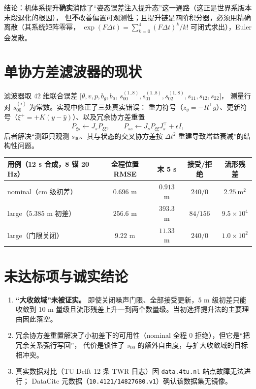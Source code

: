 \documentclass[11pt,a4paper]{ctexart}
\begin{document}
结论：机体系提升\textbf{确实}消除了“姿态误差注入提升态”这一通路（这正是世界系版本末段退化的根因），
但\textbf{不}改善偏置可观测性；且提升链是四阶积分器，必须用精确离散（其系统矩阵零幂，
\(\exp(F\Delta t)=\sum_{k=0}^{4}(F\Delta t)^k/k!\) 可闭式求出），Euler 会发散。

\section{单协方差滤波器的现状}

滤波器取 42 维联合误差
\(\big[\theta,v,p,b_g,b_a,\,s_{00}^{(1..8)},s_{01}^{(1..8)},s_{02}^{(1..8)},s_{11},s_{12},s_{22}\big]\)，
测量行对 \(s_{00}^{(i)}\) 为常数。实现中修正了三处真实错误：
重力符号（\(z_g=-R^{\top}g\)）、更新符号（\(\xi^{+}=+K(y-\hat y)\)）、以及冗余协方差重置
\begin{equation}
P_{\xi s}\leftarrow J_sP_{\xi\xi},\qquad
P_{ss}\leftarrow J_sP_{\xi\xi}J_s^{\top}+\epsilon I ,
\end{equation}
后者解决“测距只观测 \(s_{00}\)、其与状态的交叉协方差按 \(\Delta t^2\) 重建导致增益衰减”的结构性问题。

\begin{table}[h]
\centering
\small
\begin{tabular}{lcccc}
\toprule
用例（12 s 合成，8 锚 20 Hz） & 全程位置 RMSE & 末 5 s & 接受/拒绝 & 流形残差 \\
\midrule
nominal（cm 级初差） & \(0.696\) m & \(0.913\) m & \(240/0\) & \(2.25\ \mathrm{m^2}\) \\
large（\(5.385\) m 初差） & \(256.6\) m & \(393.3\) m & \(84/156\) & \(9.5\times10^{4}\) \\
large（门限关闭） & \(9.22\) m & \(11.33\) m & \(240/0\) & \(1.0\times10^{2}\) \\
\bottomrule
\end{tabular}
\end{table}

\section{未达标项与诚实结论}

\begin{enumerate}
\item \textbf{“大收敛域”未被证实。} 即使关闭噪声门限、全部接受更新，5 m 级初差只能收敛到
10 m 量级且流形残差上升一到两个数量级。当初选择提升法的主要理由因此落空。
\item 冗余协方差重置解决了小初差下的可用性（nominal 全程 0 拒绝），但它是“把冗余关系强行写回”，
代价是锁住了 \(s_{00}\) 的额外自由度，与扩大收敛域的目标相冲突。
\item 真实数据对比（TU Delft 12 条 TWR 日志）因 \texttt{data.4tu.nl} 站点故障无法进行；
DataCite 元数据（\texttt{10.4121/14827680.v1}）确认该数据集无镜像。
\end{enumerate}
\end{document}
